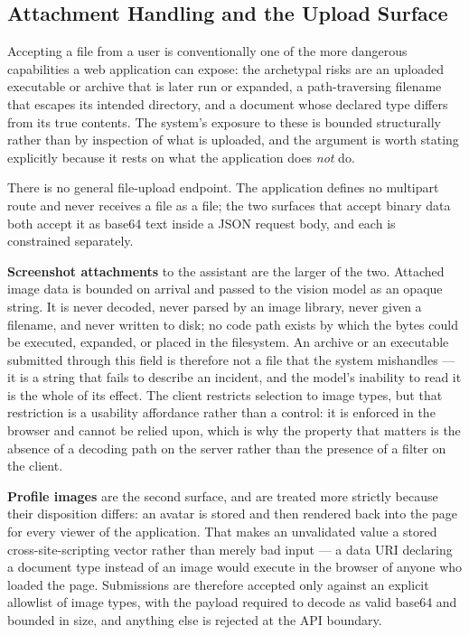 \documentclass[12pt, a4paper]{article}
\begin{document}
\subsection{Attachment Handling and the Upload Surface}
\label{sec:hardening-upload}

Accepting a file from a user is conventionally one of the more dangerous
capabilities a web application can expose: the archetypal risks are an uploaded
executable or archive that is later run or expanded, a path-traversing filename
that escapes its intended directory, and a document whose declared type differs
from its true contents. The system's exposure to these is bounded structurally
rather than by inspection of what is uploaded, and the argument is worth stating
explicitly because it rests on what the application does \emph{not} do.

There is no general file-upload endpoint. The application defines no multipart
route and never receives a file as a file; the two surfaces that accept binary
data both accept it as base64 text inside a JSON request body, and each is
constrained separately.

\textbf{Screenshot attachments} to the assistant are the larger of the two.
Attached image data is bounded on arrival and passed to the vision model as an
opaque string. It is never decoded, never parsed by an image library, never
given a filename, and never written to disk; no code path exists by which the
bytes could be executed, expanded, or placed in the filesystem. An archive or an
executable submitted through this field is therefore not a file that the system
mishandles --- it is a string that fails to describe an incident, and the
model's inability to read it is the whole of its effect. The client restricts
selection to image types, but that restriction is a usability affordance rather
than a control: it is enforced in the browser and cannot be relied upon, which
is why the property that matters is the absence of a decoding path on the server
rather than the presence of a filter on the client.

\textbf{Profile images} are the second surface, and are treated more strictly
because their disposition differs: an avatar is stored and then rendered back
into the page for every viewer of the application. That makes an unvalidated
value a stored cross-site-scripting vector rather than merely bad input --- a
data URI declaring a document type instead of an image would execute in the
browser of anyone who loaded the page. Submissions are therefore accepted only
against an explicit allowlist of image types, with the payload required to
decode as valid base64 and bounded in size, and anything else is rejected at the
API boundary.
\end{document}
